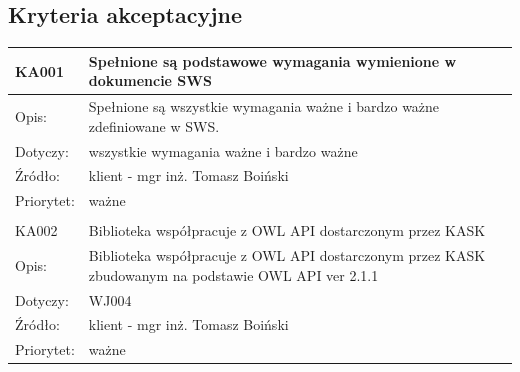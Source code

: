 \subsection{Kryteria akceptacyjne}


\begin{center}

\begin{tabular}{|m{3cm}|m{9cm}|} \hline

KA001 & Spełnione są podstawowe wymagania wymienione w dokumencie SWS \\ \hline
Opis: & Spełnione są wszystkie wymagania ważne i bardzo ważne zdefiniowane w SWS. \\ \hline
Dotyczy: & wszystkie wymagania ważne i bardzo ważne \\ \hline
Źródło: & klient - mgr inż. Tomasz Boiński \\ \hline
Priorytet: & ważne  \\ \hline %

\multicolumn{2}{c}{} \\
 \hline

KA002 & Biblioteka współpracuje z OWL API dostarczonym przez KASK \\ \hline
Opis: & Biblioteka współpracuje z OWL API dostarczonym przez KASK zbudowanym na podstawie OWL API ver 2.1.1\\ \hline
Dotyczy: & WJ004 \\ \hline
Źródło: & klient - mgr inż. Tomasz Boiński \\ \hline
Priorytet: & ważne  \\ \hline %

\end{tabular}

\end{center}


